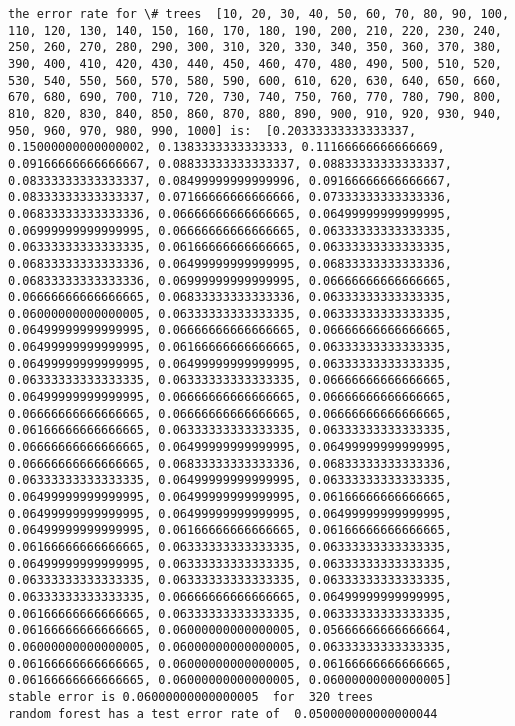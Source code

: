 \documentclass[11pt]{article}
\begin{document}
    \begin{Verbatim}[commandchars=\\\{\}]
the error rate for \# trees  [10, 20, 30, 40, 50, 60, 70, 80, 90, 100, 110, 120, 130, 140, 150, 160, 170, 180, 190, 200, 210, 220, 230, 240, 250, 260, 270, 280, 290, 300, 310, 320, 330, 340, 350, 360, 370, 380, 390, 400, 410, 420, 430, 440, 450, 460, 470, 480, 490, 500, 510, 520, 530, 540, 550, 560, 570, 580, 590, 600, 610, 620, 630, 640, 650, 660, 670, 680, 690, 700, 710, 720, 730, 740, 750, 760, 770, 780, 790, 800, 810, 820, 830, 840, 850, 860, 870, 880, 890, 900, 910, 920, 930, 940, 950, 960, 970, 980, 990, 1000] is:  [0.20333333333333337, 0.15000000000000002, 0.1383333333333333, 0.11166666666666669, 0.09166666666666667, 0.08833333333333337, 0.08833333333333337, 0.08333333333333337, 0.08499999999999996, 0.09166666666666667, 0.08333333333333337, 0.07166666666666666, 0.07333333333333336, 0.06833333333333336, 0.06666666666666665, 0.06499999999999995, 0.06999999999999995, 0.06666666666666665, 0.06333333333333335, 0.06333333333333335, 0.06166666666666665, 0.06333333333333335, 0.06833333333333336, 0.06499999999999995, 0.06833333333333336, 0.06833333333333336, 0.06999999999999995, 0.06666666666666665, 0.06666666666666665, 0.06833333333333336, 0.06333333333333335, 0.06000000000000005, 0.06333333333333335, 0.06333333333333335, 0.06499999999999995, 0.06666666666666665, 0.06666666666666665, 0.06499999999999995, 0.06166666666666665, 0.06333333333333335, 0.06499999999999995, 0.06499999999999995, 0.06333333333333335, 0.06333333333333335, 0.06333333333333335, 0.06666666666666665, 0.06499999999999995, 0.06666666666666665, 0.06666666666666665, 0.06666666666666665, 0.06666666666666665, 0.06666666666666665, 0.06166666666666665, 0.06333333333333335, 0.06333333333333335, 0.06666666666666665, 0.06499999999999995, 0.06499999999999995, 0.06666666666666665, 0.06833333333333336, 0.06833333333333336, 0.06333333333333335, 0.06499999999999995, 0.06333333333333335, 0.06499999999999995, 0.06499999999999995, 0.06166666666666665, 0.06499999999999995, 0.06499999999999995, 0.06499999999999995, 0.06499999999999995, 0.06166666666666665, 0.06166666666666665, 0.06166666666666665, 0.06333333333333335, 0.06333333333333335, 0.06499999999999995, 0.06333333333333335, 0.06333333333333335, 0.06333333333333335, 0.06333333333333335, 0.06333333333333335, 0.06333333333333335, 0.06666666666666665, 0.06499999999999995, 0.06166666666666665, 0.06333333333333335, 0.06333333333333335, 0.06166666666666665, 0.06000000000000005, 0.05666666666666664, 0.06000000000000005, 0.06000000000000005, 0.06333333333333335, 0.06166666666666665, 0.06000000000000005, 0.06166666666666665, 0.06166666666666665, 0.06000000000000005, 0.06000000000000005]
stable error is 0.06000000000000005  for  320 trees
random forest has a test error rate of  0.050000000000000044

    \end{Verbatim}
\end{document}
